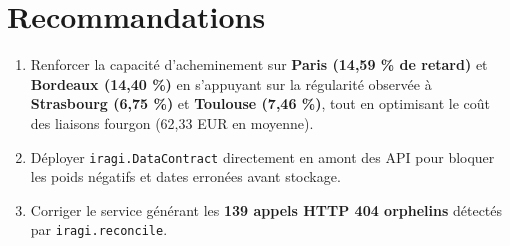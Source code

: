\documentclass[11pt,a4paper]{article}
\begin{document}
\section{Recommandations}
\begin{enumerate}
    \item Renforcer la capacit\'e d'acheminement sur \textbf{Paris (14,59 \% de retard)} et \textbf{Bordeaux (14,40 \%)} en s'appuyant sur la r\'egularit\'e observ\'ee \`a \textbf{Strasbourg (6,75 \%)} et \textbf{Toulouse (7,46 \%)}, tout en optimisant le co\^ut des liaisons fourgon (62,33 EUR en moyenne).
    \item D\'eployer \texttt{iragi.DataContract} directement en amont des API pour bloquer les poids n\'egatifs et dates erron\'ees avant stockage.
    \item Corriger le service g\'en\'erant les \textbf{139 appels HTTP 404 orphelins} d\'etect\'es par \texttt{iragi.reconcile}.
\end{enumerate}

\end{document}
